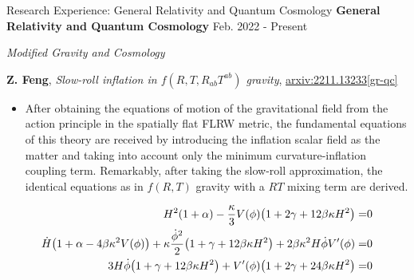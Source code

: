 \documentclass[9pt,aspectratio=169,hyperref=colorlinks]{beamer}
\begin{document}
\begin{frame}{Research Experience: General Relativity and Quantum Cosmology}
    \textbf{General Relativity and Quantum Cosmology} \hfill Feb. 2022 - Present

    \smallskip \quad \textit{Modified Gravity and Cosmology}

    \textbf{Z. Feng}, \textit{Slow-roll inflation in $f\left(R, T, R_{ab}T^{ab}\right)$ gravity}, \href{https://arxiv.org/abs/2211.13233}{arxiv:2211.13233[gr-qc]}

    \begin{itemize}
        \item After obtaining the equations of motion of the gravitational field from the action principle in the spatially flat FLRW metric, the fundamental equations of this theory are received by introducing the inflation scalar field as the matter and taking into account only the minimum curvature-inflation coupling term. Remarkably, after taking the slow-roll approximation, the identical equations as in $f(R, T)$ gravity with a $R T$ mixing term are derived.
    \end{itemize}

    \begin{align*}
        H^2 (1 + \alpha) - \frac{\kappa}{3}  V(\phi) \qty(1 + 2 \gamma + 12 \beta \kappa H^2) =                                                                               & 0 \\
        \dot{H} \qty(1 + \alpha - 4 \beta \kappa^2 V(\phi)) + \kappa \frac{\dot{\phi}^2}{2} \qty(1 + \gamma + 12 \beta \kappa H^2) + 2 \beta \kappa^2 H \dot{\phi} V'(\phi) = & 0 \\
        3 H \dot{\phi} \qty(1 + \gamma + 12 \beta \kappa H^2) + V'(\phi) \qty(1 + 2 \gamma + 24 \beta \kappa H^2) =                                                           & 0
    \end{align*}
\end{frame}
\end{document}
